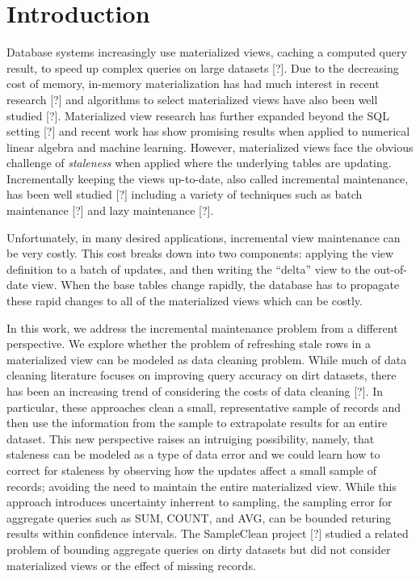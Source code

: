 \section{Introduction}
Database systems increasingly use materialized views, caching a computed
query result, to speed up complex queries on large datasets {[}?{]}. 
Due to the decreasing cost of memory, in-memory materialization 
has had much interest in recent research [?] and algorithms
to select materialized views have also been well studied [?].
Materialized view research has further expanded beyond the SQL setting [?] and 
recent work has show promising results when applied to 
numerical linear algebra and machine learning.
However, materialized views face the obvious challenge of \emph{staleness} 
when applied where the underlying tables are updating.
Incrementally keeping the views up-to-date,
also called incremental maintenance, has been well studied {[}?{]}
including a variety of techniques such as batch maintenance {[}?{]}
and lazy maintenance {[}?{]}. 

Unfortunately, in many desired applications, incremental view maintenance
can be very costly. 
This cost breaks down into two components: applying
the view definition to a batch of updates, and then writing the ``delta''
view to the out-of-date view.
When the base tables change rapidly, the database has to propagate these rapid changes to
all of the materialized views which can be costly.

In this work, we address the incremental maintenance problem from a different perspective.
We explore whether the problem of refreshing stale rows in a materialized view can be modeled as data cleaning problem.
While much of data cleaning literature focuses on improving query accuracy on dirt datasets,
there has been an increasing trend of considering the costs of data cleaning [?].
In particular, these approaches clean a small, representative sample of records and then use the information from the sample to extrapolate results for an entire dataset.
This new perspective raises an intruiging possibility, namely, that staleness can be modeled as a type of data error 
and we could learn how to correct for staleness by observing how the updates affect a small sample of records; 
avoiding the need to maintain the entire materialized view.
While this approach introduces uncertainty inherrent to sampling, the sampling error for aggregate queries such as SUM, COUNT, and AVG, 
can be bounded returing results within confidence intervals.
The SampleClean project [?] studied a related problem of bounding aggregate queries on dirty datasets but did not consider materialized views or the effect of missing records.

